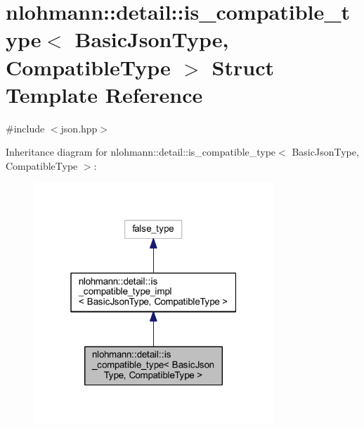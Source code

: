 \hypertarget{structnlohmann_1_1detail_1_1is__compatible__type}{}\section{nlohmann\+::detail\+::is\+\_\+compatible\+\_\+type$<$ Basic\+Json\+Type, Compatible\+Type $>$ Struct Template Reference}
\label{structnlohmann_1_1detail_1_1is__compatible__type}


{\ttfamily \#include $<$json.\+hpp$>$}



Inheritance diagram for nlohmann\+::detail\+::is\+\_\+compatible\+\_\+type$<$ Basic\+Json\+Type, Compatible\+Type $>$\+:
\nopagebreak
\begin{figure}[H]
\begin{center}
\leavevmode
\includegraphics[width=256pt]{structnlohmann_1_1detail_1_1is__compatible__type__inherit__graph}
\end{center}
\end{figure}



